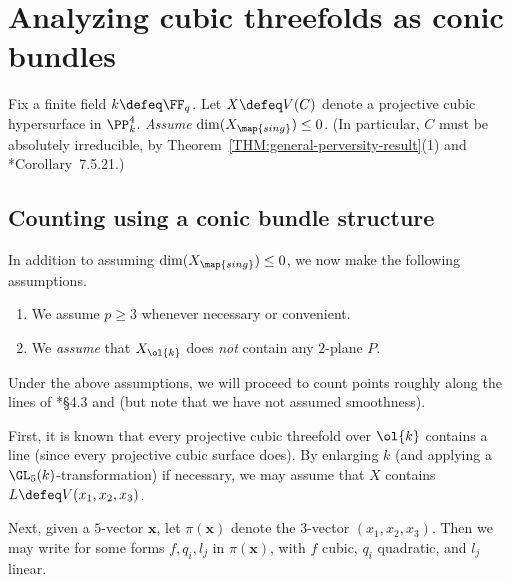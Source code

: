\documentclass[12pt]{report}
\begin{document}
\section{Analyzing cubic threefolds as conic bundles}
\label{SEC:conic-bundle-analysis-of-cubic-threefolds-over-F_q}

Fix a finite field $k\defeq\FF_q$.
Let $X\defeq V(C)$ denote a projective cubic hypersurface in $\PP^4_k$.
\emph{Assume} $\dim(X_{\map{sing}})\leq 0$.
(In particular,
$C$ must be absolutely irreducible,
by Theorem~\ref{THM:general-perversity-result}(1) and \cite{poonen2017rational}*{Corollary~7.5.21}.)

\subsection{Counting using a conic bundle structure}

In addition to assuming $\dim(X_{\map{sing}})\leq 0$,
we now make the following assumptions.
\begin{enumerate}[(1)]
    \item We assume $p\geq 3$ whenever necessary or convenient.
    
    \item We \emph{assume} that $X_{\ol{k}}$ does \emph{not} contain any $2$-plane $P$.
\end{enumerate}
Under the above assumptions,
we will proceed to count points roughly along the lines of \cite{debarre2021lines}*{\S4.3} and \cite{github-alaface-CubLin-2016}
(but note that we have not assumed smoothness).

First, it is known that every projective cubic threefold over $\ol{k}$ contains a line
(since every projective cubic surface does).
By enlarging $k$
(and applying a $\GL_5(k)$-transformation)
if necessary,
we may assume that $X$ contains $L\defeq V(x_1,x_2,x_3)$.

Next, given a $5$-vector $\bm{x}$,
let $\pi(\bm{x})$ denote the $3$-vector $(x_1,x_2,x_3)$.
Then we may write
for some forms $f,q_i,l_j$ in $\pi(\bm{x})$,
with $f$ cubic, $q_i$ quadratic, and $l_j$ linear.


\end{document}
